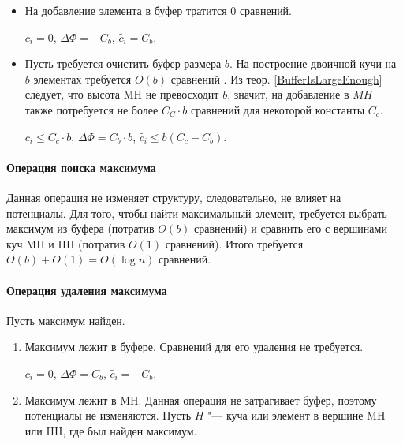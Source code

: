 \begin{itemize}
\item На добавление элемента в буфер тратится 0 сравнений.

$c_i = 0$, $\Delta\Phi = -C_b$, $\tilde{c_i} = C_b$.
\item Пусть требуется очистить буфер размера $b$. На построение двоичной кучи на $b$ элементах требуется
$O(b)$ сравнений . Из теор. \ref{BufferIsLargeEnough}
следует, что высота MH не превосходит $b$, значит, на добавление в $MH$
также потребуется не более $C_C\cdot b$ сравнений для некоторой константы $C_c$.

$c_i \leq C_c \cdot b$, $\Delta\Phi = C_b \cdot b$, $\tilde{c_i} \leq b(C_c - C_b)$.
\end{itemize}

\paragraph{Операция поиска максимума}
Данная операция не изменяет структуру, следовательно, не влияет на потенциалы. Для того,
чтобы найти максимальный элемент, требуется выбрать максимум из буфера (потратив $O(b)$ сравнений)
и сравнить его с вершинами куч MH и HH (потратив $O(1)$ сравнений). Итого требуется $O(b) + O(1) = O(\log n)$
сравнений.

\paragraph{Операция удаления максимума}
Пусть максимум найден.
\begin{enumerate}
\item Максимум лежит в буфере. Сравнений для его удаления не требуется.

$c_i = 0$, $\Delta\Phi = C_b$, $\tilde{c_i} = -C_b$.
\item Максимум лежит в MH. Данная операция не затрагивает буфер, поэтому
потенциалы не изменяются. Пусть $H$ "--- куча или элемент в вершине MH или HH, где был найден
максимум.
\end{enumerate}
